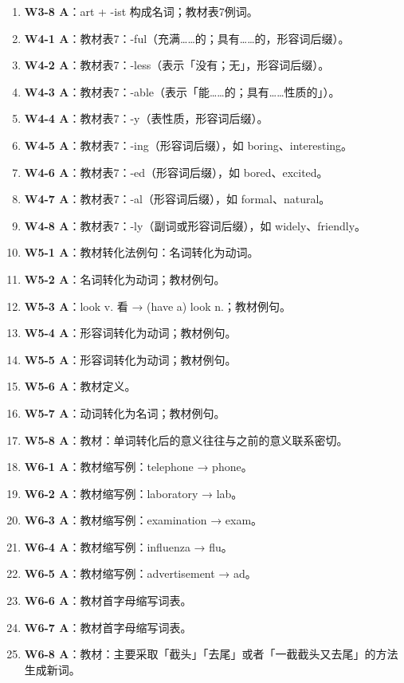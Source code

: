 \documentclass[11pt,a4paper]{ctexart}
\begin{document}
\begin{enumerate}[leftmargin=1.6em,itemsep=2pt]
\item \textbf{W3-8 A}：art + -ist 构成名词；教材表7例词。
\item \textbf{W4-1 A}：教材表7：-ful（充满……的；具有……的，形容词后缀）。
\item \textbf{W4-2 A}：教材表7：-less（表示「没有；无」，形容词后缀）。
\item \textbf{W4-3 A}：教材表7：-able（表示「能……的；具有……性质的」）。
\item \textbf{W4-4 A}：教材表7：-y（表性质，形容词后缀）。
\item \textbf{W4-5 A}：教材表7：-ing（形容词后缀），如 boring、interesting。
\item \textbf{W4-6 A}：教材表7：-ed（形容词后缀），如 bored、excited。
\item \textbf{W4-7 A}：教材表7：-al（形容词后缀），如 formal、natural。
\item \textbf{W4-8 A}：教材表7：-ly（副词或形容词后缀），如 widely、friendly。
\item \textbf{W5-1 A}：教材转化法例句：名词转化为动词。
\item \textbf{W5-2 A}：名词转化为动词；教材例句。
\item \textbf{W5-3 A}：look v. 看 → (have a) look n.；教材例句。
\item \textbf{W5-4 A}：形容词转化为动词；教材例句。
\item \textbf{W5-5 A}：形容词转化为动词；教材例句。
\item \textbf{W5-6 A}：教材定义。
\item \textbf{W5-7 A}：动词转化为名词；教材例句。
\item \textbf{W5-8 A}：教材：单词转化后的意义往往与之前的意义联系密切。
\item \textbf{W6-1 A}：教材缩写例：telephone → phone。
\item \textbf{W6-2 A}：教材缩写例：laboratory → lab。
\item \textbf{W6-3 A}：教材缩写例：examination → exam。
\item \textbf{W6-4 A}：教材缩写例：influenza → flu。
\item \textbf{W6-5 A}：教材缩写例：advertisement → ad。
\item \textbf{W6-6 A}：教材首字母缩写词表。
\item \textbf{W6-7 A}：教材首字母缩写词表。
\item \textbf{W6-8 A}：教材：主要采取「截头」「去尾」或者「一截截头又去尾」的方法生成新词。
\end{enumerate}
\end{document}
